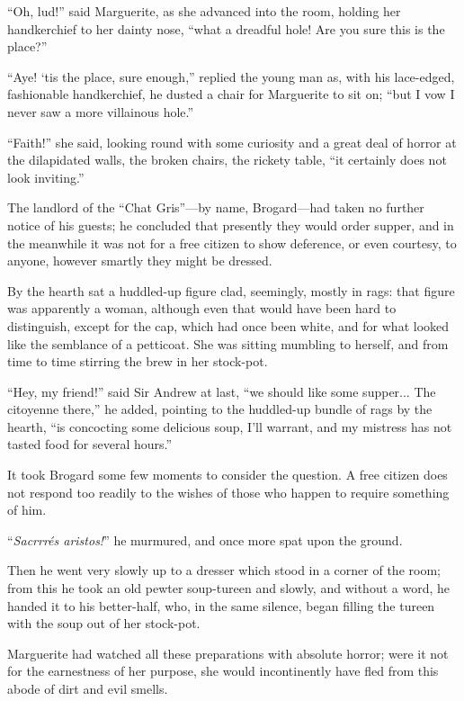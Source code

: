 \documentclass[paper=5.5in:8.5in,BCOR=7mm,twoside,DIV=calc,12pt,usegeometry,chapterprefix,endperiod,headings=big]{scrbook}
\begin{document}
\enquote{Oh, lud!} said Marguerite, as she advanced into the room, holding her handkerchief to her dainty nose, \enquote{what a dreadful hole! Are you sure this is the place?}

\enquote{Aye! `tis the place, sure enough,} replied the young man as, with his lace-edged, fashionable handkerchief, he dusted a chair for Marguerite to sit on; \enquote{but I vow I never saw a more villainous hole.}

\enquote{Faith!} she said, looking round with some curiosity and a great deal of horror at the dilapidated walls, the broken chairs, the rickety table, \enquote{it certainly does not look inviting.}

The landlord of the \enquote{Chat Gris}---by name, Brogard---had taken no further notice of his guests; he concluded that presently they would order supper, and in the meanwhile it was not for a free citizen to show deference, or even courtesy, to anyone, however smartly they might be dressed.

By the hearth sat a huddled-up figure clad, seemingly, mostly in rags: that figure was apparently a woman, although even that would have been hard to distinguish, except for the cap, which had once been white, and for what looked like the semblance of a petticoat. She was sitting mumbling to herself, and from time to time stirring the brew in her stock-pot.

\enquote{Hey, my friend!} said Sir Andrew at last, \enquote{we should like some supper... The citoyenne there,} he added, pointing to the huddled-up bundle of rags by the hearth, \enquote{is concocting some delicious soup, I'll warrant, and my mistress has not tasted food for several hours.}

It took Brogard some few moments to consider the question. A free citizen does not respond too readily to the wishes of those who happen to require something of him.

\enquote{\textit{Sacrrrés aristos!}} he murmured, and once more spat upon the ground.

Then he went very slowly up to a dresser which stood in a corner of the room; from this he took an old pewter soup-tureen and slowly, and without a word, he handed it to his better-half, who, in the same silence, began filling the tureen with the soup out of her stock-pot.

Marguerite had watched all these preparations with absolute horror; were it not for the earnestness of her purpose, she would incontinently have fled from this abode of dirt and evil smells.
\end{document}
